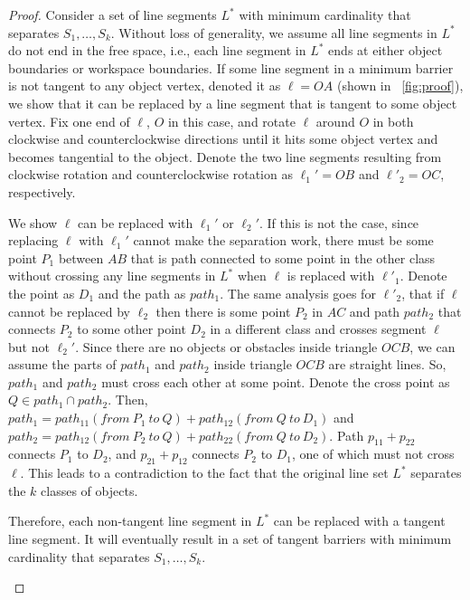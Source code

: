 \begin{proof}

Consider a set of line segments $L^*$ with minimum cardinality that separates $S_1,\dots, S_k$. 
Without loss of generality, we assume all line segments in $L^*$ do not end in the free space, i.e., each line segment in $L^*$ ends
at either object boundaries or workspace boundaries.
If some line segment in a minimum barrier is not tangent to any object vertex, denoted it as $\ell=OA$ (shown in ~\ref{fig:proof}), we show that it can be replaced by a line segment that is tangent to some object vertex. 
%
Fix one end of $\ell$, $O$ in this case, and rotate $\ell$ around $O$ in both clockwise and counterclockwise directions until it hits some object vertex and becomes tangential to the object.
%
Denote the two line segments resulting from clockwise rotation and counterclockwise rotation as $\ell_1'=OB$ and $\ell'_2=OC$, respectively. 

We show $\ell$ can be replaced with $\ell_1'$ or $\ell_2'$. 
If this is not the case,
since replacing $\ell$ with $\ell_1'$ cannot make the separation work, there must be some point $P_1$ between $AB$ that is path connected to some point in the other class without crossing any line segments in $L^*$ when $\ell$ is replaced with $\ell'_1$. Denote the point as $D_1$ and the path as $path_1$. 
The same analysis goes for $\ell'_2$, that if $\ell$ cannot be replaced by $\ell_2$ then there is some point $P_2$ in $AC$ and path $path_2$ that connects $P_2$ to some other point $D_2$ in a different class and crosses segment $\ell$ but not $\ell_2'$. 
Since there are no objects or obstacles inside triangle $OCB$, we can assume the parts of $path_1$ and $path_2$ inside triangle $OCB$ are straight lines.
So, $path_1$ and $path_2$ must cross each other at some point. 
Denote the cross point as $Q\in path_1 \cap path_2$. 
Then, $path_1 = path_{11} (from\ P_1\ to\ Q) + path_{12} (from\ Q\ to\ D_1)$ and $path_2 = path_{12} (from\ P_2\ to\ Q) + path_{22} (from\ Q\ to\ D_2)$. 
Path $p_{11} + p_{22}$ connects $P_1$ to $D_2$, and $p_{21} + p_{12}$ connects $P_2$ to $D_1$, one of which must not cross $\ell$. 
This leads to a contradiction to the fact that the original line set $L^*$ separates the $k$ classes of objects.

Therefore, each non-tangent line segment in $L^*$ can be replaced with a tangent line segment. 
It will eventually result in a set of tangent barriers with minimum cardinality that separates $S_1,\dots,S_k$.
\begin{figure}[ht]
    \vspace{-2mm}
    \centering
{}
\end{figure}
\end{proof}
